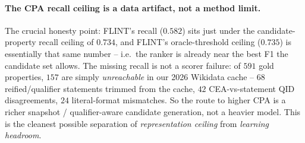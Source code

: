 \paragraph{The CPA recall ceiling is a data artifact, not a method limit.}
The crucial honesty point: FLINT's recall ($0.582$) sits just under the
candidate-property recall ceiling of $0.734$, and FLINT's oracle-threshold ceiling
($0.735$) is essentially that same number -- i.e.\ the ranker is already near the
best F1 the candidate set allows. The missing recall is not a scorer failure: of
$591$ gold properties, $157$ are simply \emph{unreachable} in our 2026 Wikidata
cache -- $68$ reified/qualifier statements trimmed from the cache, $42$
CEA-vs-statement QID disagreements, $24$ literal-format mismatches. So the route to
higher CPA is a richer snapshot / qualifier-aware candidate generation, not a
heavier model. This is the cleanest possible separation of \emph{representation
ceiling} from \emph{learning headroom}.

